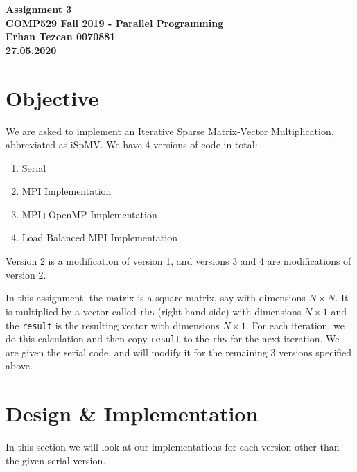 \documentclass[12pt,reqno]{amsart}
\newcommand{\code}[1]{\texttt{#1}}
\begin{document}
\begin{center}
\large\textbf{Assignment 3 \\ COMP529 Fall 2019 - Parallel Programming} \\
\normalsize\textbf{Erhan Tezcan 0070881 \\ 27.05.2020} \\
\end{center}



\section{Objective}

We are asked to implement an Iterative Sparse Matrix-Vector Multiplication, abbreviated as iSpMV. We have 4 versions of code in total:
\begin{enumerate}
	\item Serial
	\item MPI Implementation
	\item MPI+OpenMP Implementation
	\item Load Balanced MPI Implementation
\end{enumerate}
Version 2 is a modification of version 1, and versions 3 and 4 are modifications of version 2.

In this assignment, the matrix is a square matrix, say with dimensions $N\times N$. It is multiplied by a vector called \code{rhs} (right-hand side) with dimensions $N\times1$ and the \code{result} is the resulting vector with dimensions $N\times1$. For each iteration, we do this calculation and then copy \code{result} to the \code{rhs} for the next iteration. We are given the serial code, and will modify it for the remaining 3 versions specified above.

\section{Design \& Implementation}

In this section we will look at our implementations for each version other than the given serial version.
\end{document}
